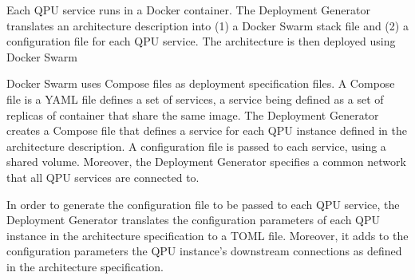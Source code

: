 Each QPU service runs in a Docker \cite{docker} container.
The Deployment Generator translates an architecture description into (1) a Docker Swarm stack file
and (2) a configuration file for each QPU service.
The architecture is then deployed using Docker Swarm \cite{docker:swarm}

Docker Swarm uses Compose files \cite{docker:composefile} as deployment specification files.
A Compose file is a YAML \cite{yaml} file defines a set of services, a service being defined as a set of replicas of container that share the same image.
The Deployment Generator creates a Compose file that defines a service for each QPU instance defined in the architecture description.
A configuration file is passed to each service, using a shared volume.
Moreover, the Deployment Generator specifies a common network that all QPU services are connected to.

In order to generate the configuration file to be passed to each QPU service, the Deployment Generator translates the configuration parameters
of each QPU instance in the architecture specification to a TOML \cite{toml} file.
Moreover, it adds to the configuration parameters the QPU instance's downstream connections as defined in the architecture specification.



